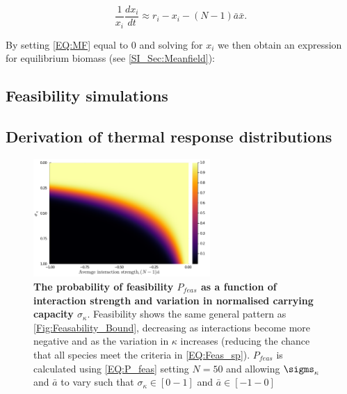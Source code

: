 \documentclass{article}
\begin{document}
\begin{equation} \label{EQ:MF}
    \frac{1}{x_i} \frac{dx_i}{dt} \approx r_i - x_i - (N-1)\bar{a}\bar{x}.
\end{equation}

By setting \cref{EQ:MF} equal to $0$ and solving for $x_i$ we then obtain an expression for equilibrium biomass (see \cref{SI_Sec:Meanfield}):


\subsection{Feasibility simulations} \label{SI_Sec:Feas_sims}

\subsection{Derivation of thermal response distributions} \label{SI_Sec:TPC_dist}

\begin{figure}
    \centering
    \includegraphics[width = 0.6\textwidth]{docs/Figures/Fig_2.pdf}
    \caption{\textbf{The probability of feasibility $P_{feas}$ as a function of interaction strength and variation in normalised carrying capacity $\sigma_{\kappa}$}. Feasibility shows the same general pattern as \cref{Fig:Feasability_Bound}, decreasing as interactions become more negative and as the variation in $\kappa$ increases (reducing the chance that all species meet the criteria in \cref{EQ:Feas_sp}). $P_{feas}$ is calculated using \cref{EQ:P_feas} setting $N=50$ and allowing $\sigms_{\kappa}$ and $\bar{a}$ to vary such that $\sigma_{\kappa} \in [0 - 1]$ and $\bar{a} \in [-1 - 0]$}
    \label{Fig:P_feas}
\end{figure}
\end{document}
